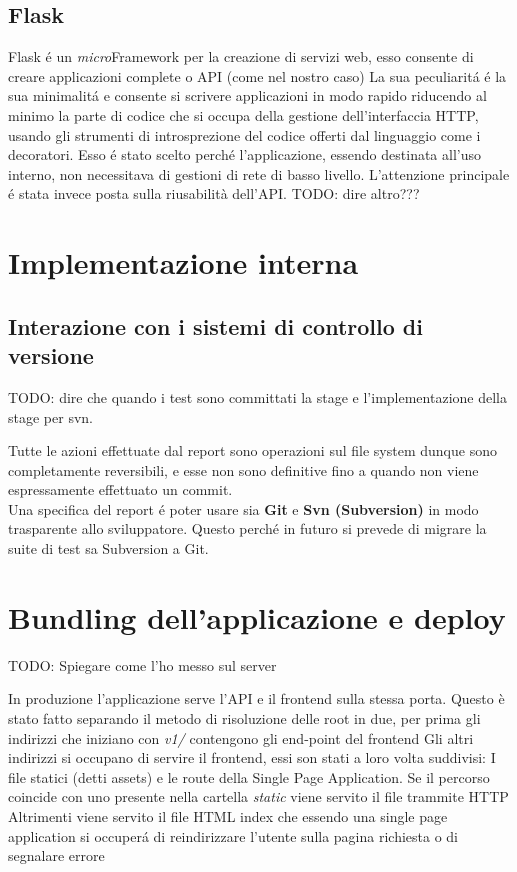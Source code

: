         \subsection{Flask}  
            Flask \'e un \textit{micro}Framework per la creazione di servizi web, esso consente di creare applicazioni complete o API (come nel nostro caso)
            La sua peculiarit\'a \'e la sua minimalit\'a e consente si scrivere applicazioni in modo rapido riducendo al minimo la parte di codice che si occupa della gestione dell'interfaccia HTTP, usando gli strumenti di introsprezione del codice offerti dal linguaggio come i decoratori.
            Esso \'e stato scelto perch\'e l'applicazione, essendo destinata all'uso interno, non necessitava di gestioni di rete di basso livello.
            L'attenzione principale \'e stata invece posta sulla riusabilità dell'API. TODO: dire altro???

    \section{Implementazione interna}
        \subsection{Interazione con i sistemi di controllo di versione}
                
            TODO: dire che quando i test sono committati la stage e l'implementazione della stage per svn.

            Tutte le azioni effettuate dal report sono operazioni sul file system dunque sono completamente reversibili, e esse non sono definitive fino a quando non viene espressamente effettuato un commit.\\
            Una specifica del report \'e poter usare sia \textbf{Git} e \textbf{Svn (Subversion)} in modo trasparente allo sviluppatore.
            Questo perch\'e in futuro si prevede di migrare la suite di test sa Subversion a Git.
    
    \section{Bundling dell'applicazione e deploy}
        TODO: Spiegare come l'ho messo sul server

        In produzione l'applicazione serve l'API e il frontend sulla stessa porta.
        Questo è stato fatto separando il metodo di risoluzione delle root in due, per prima gli indirizzi che iniziano con \textit{v1/} contengono gli end-point del frontend
        Gli altri indirizzi si occupano di servire il frontend, essi son stati a loro volta suddivisi:
        I file statici (detti assets) e le route della Single Page Application.
        Se il percorso coincide con uno presente nella cartella \textit{static} viene servito il file trammite HTTP
        Altrimenti viene servito il file HTML index che essendo una single page application si occuper\'a di reindirizzare l'utente sulla pagina richiesta o di segnalare errore